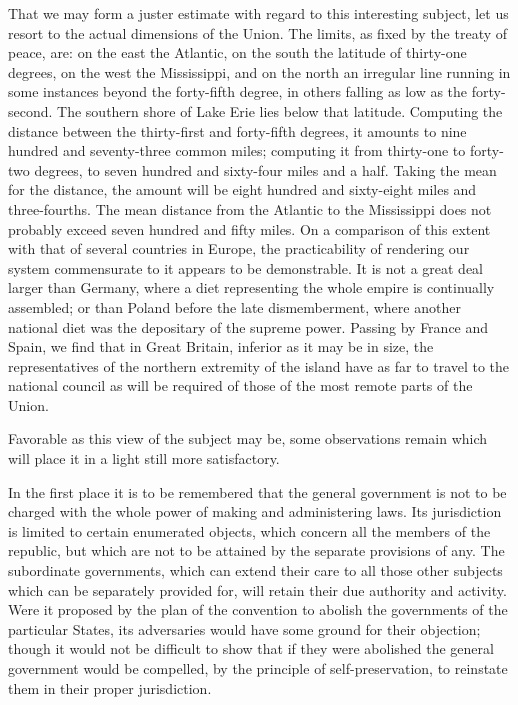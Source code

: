 That we may form a juster estimate with regard to this interesting subject, let us resort to the actual dimensions of the Union. The limits, as fixed by the treaty of peace, are: on the east the Atlantic, on the south the latitude of thirty-one degrees, on the west the Mississippi, and on the north an irregular line running in some instances beyond the forty-fifth degree, in others falling as low as the forty-second. The southern shore of Lake Erie lies below that latitude. Computing the distance between the thirty-first and forty-fifth degrees, it amounts to nine hundred and seventy-three common miles; computing it from thirty-one to forty-two degrees, to seven hundred and sixty-four miles and a half. Taking the mean for the distance, the amount will be eight hundred and sixty-eight miles and three-fourths. The mean distance from the Atlantic to the Mississippi does not probably exceed seven hundred and fifty miles. On a comparison of this extent with that of several countries in Europe, the practicability of rendering our system commensurate to it appears to be demonstrable. It is not a great deal larger than Germany, where a diet representing the whole empire is continually assembled; or than Poland before the late dismemberment, where another national diet was the depositary of the supreme power. Passing by France and Spain, we find that in Great Britain, inferior as it may be in size, the representatives of the northern extremity of the island have as far to travel to the national council as will be required of those of the most remote parts of the Union.

Favorable as this view of the subject may be, some observations remain which will place it in a light still more satisfactory.

In the first place it is to be remembered that the general government is not to be charged with the whole power of making and administering laws. Its jurisdiction is limited to certain enumerated objects, which concern all the members of the republic, but which are not to be attained by the separate provisions of any. The subordinate governments, which can extend their care to all those other subjects which can be separately provided for, will retain their due authority and activity. Were it proposed by the plan of the convention to abolish the governments of the particular States, its adversaries would have some ground for their objection; though it would not be difficult to show that if they were abolished the general government would be compelled, by the principle of self-preservation, to reinstate them in their proper jurisdiction.

